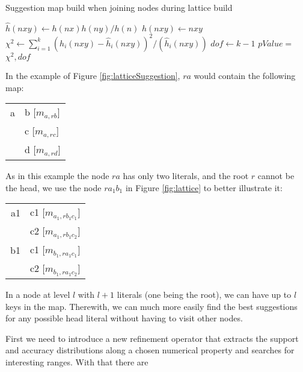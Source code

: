 \begin{algorithm}[h!]
 \caption{Suggestion map build when joining nodes during lattice build}
 \label{alg:buildmaps}
  $\hat{h}(nxy) \leftarrow h(nx)h(ny)/h(n)$ \;
  $h(nxy) \leftarrow $$nxy$\FuncSty{)} \;
  $\chi^2 \leftarrow \sum_{i=1}^{k}(h_i(nxy)-\hat{h}_i(nxy))^2/(\hat{h}_i(nxy))$ \;
  $dof \leftarrow k-1$ \;
  $pValue = $$\chi^2,dof$\FuncSty{)} \;
\end{algorithm}

In the example of Figure \ref{fig:latticeSuggestion}, $ra$ would contain the following map:

\begin{center}
  \begin{tabular}{r | l}
    a & b [$m_{a,rb}$] \\
      & c [$m_{a,rc}$] \\
      & d [$m_{a,rd}$]
  \end{tabular}
\end{center}

As in this example the node $ra$ has only two literals, and the root $r$ cannot be the head, we use the node $ra_1b_1$
in Figure \ref{fig:lattice} to better illustrate it:

\begin{center}
  \begin{tabular}{r | l}
    a1 	& c1 [$m_{a_1,rb_1c_1}$] \\
	& c2 [$m_{a_1,rb_1c_2}$] \\
    \hline
    b1	& c1 [$m_{b_1,ra_1c_1}$] \\
	& c2 [$m_{b_1,ra_1c_2}$]
  \end{tabular}
\end{center}

In a node at level $l$ with $l+1$ literals (one being the root), we can have up to $l$ keys in the map. Therewith, we
can much more easily find the best suggestions for any possible head literal without having to visit other nodes.

First we need to introduce a new refinement operator that extracts the support and accuracy distributions along a chosen
numerical property and searches for interesting ranges. With that there are

